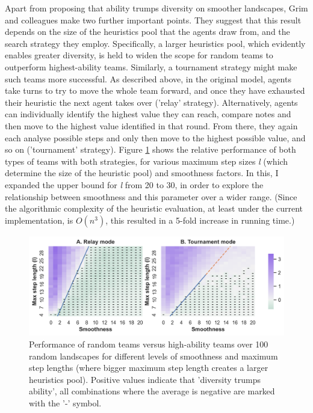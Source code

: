  Apart from proposing that ability trumps diversity on smoother landscapes, Grim and colleagues make two further important points. They suggest that this result depends on the size of the heuristics pool that the agents draw from, and the search strategy they employ. Specifically, a larger heuristics pool, which evidently enables greater diversity, is held to widen the scope for random teams to outperform highest-ability teams. Similarly, a tournament strategy might make such teams more successful. As described above, in the original model, agents take turns to try to move the whole team forward, and once they have exhausted their heuristic the next agent takes over ('relay' strategy). Alternatively, agents can individually identify the highest value they can reach, compare notes and then move to the highest value identified in that round. From there, they again each analyse possible steps and only then move to the highest possible value, and so on ('tournament' strategy). Figure \ref{fig:Grim69} shows the relative performance of both types of teams with both strategies, for various maximum step sizes \textit{l} (which determine the size of the heuristic pool) and smoothness factors. In this, I expanded the upper bound for \textit{l} from 20 to 30, in order to explore the relationship between smoothness and this parameter over a wider range. (Since the algorithmic complexity of the heuristic evaluation, at least under the current implementation, is $O(n^3)$, this resulted in a 5-fold increase in running time.) \\

 \begin{figure}
   \includegraphics[width=\linewidth]{Fig69.png}
   \caption{Performance of random teams versus high-ability teams over 100 random landscapes for different levels of smoothness and maximum step lengths (where bigger maximum step length creates a larger heuristics pool). Positive values indicate that 'diversity trumps ability', all combinations where the average is negative are marked with the '-' symbol.}
   \label{fig:Grim69}
 \end{figure}
 
